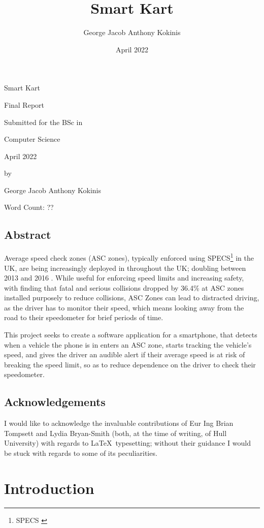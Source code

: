 \documentclass[11pt, a4paper, notitlepage]{report}
\title{Smart Kart}
\date{April 2022}
\author{George Jacob Anthony Kokinis}
\begin{document}
\begin{center}
	{\Huge Smart Kart}
	
	\bigskip
	{\Large Final Report}
	
	\bigskip
	Submitted for the BSc in
	
	\bigskip
	{\LARGE Computer Science}
	
	\bigskip
	April 2022
	
	\bigskip
	by 
	
	\bigskip
	{\LARGE George Jacob Anthony Kokinis}
    
    \bigskip
    Word Count: ?? %
\end{center}
\newpage
\section{Abstract}
Average speed check zones (ASC zones), typically enforced using SPECS\footnote{SPECS \citep{specsjenop}} in the UK, are being increasingly deployed in throughout the UK; doubling between 2013 and 2016 \citep{BBCSpeedCameraDoubled}. While useful for enforcing speed limits and increasing safety, with \citet{owenAllsop} finding that fatal and serious collisions dropped by 36.4\% at ASC zones installed purposely to reduce collisions, ASC Zones can lead to distracted driving, as the driver has to monitor their speed, which means looking away from the road to their speedometer for brief periods of time.

This project seeks to create a software application for a smartphone, that detects when a vehicle the phone is in enters an ASC zone, starts tracking the vehicle's speed, and gives the driver an audible alert if their average speed is at risk of breaking the speed limit, so as to reduce dependence on the driver to check their speedometer.

\section{Acknowledgements}
I would like to acknowledge the invaluable contributions of Eur Ing Brian Tompsett and Lydia Bryan-Smith (both, at the time of writing, of Hull University) with regards to \LaTeX\ typesetting; without their guidance I would be stuck with regards to some of its peculiarities.

\tableofcontents

\chapter{Introduction}
\end{document}
